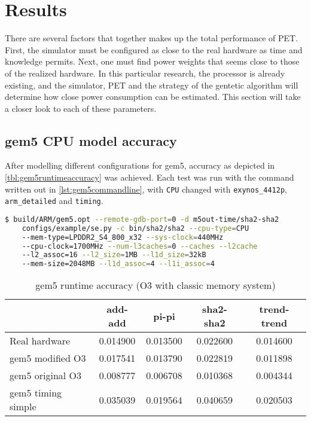 \section{Results}

There are several factors that together makes up the total performance of PET. First, the simulator must be
configured as close to the real hardware as time and knowledge permits. Next, one must find power weights that
seems close to those of the realized hardware. In this particular research, the processor is already existing,
and the simulator, PET and the strategy of the gentetic algorithm will determine how close power consumption
can be estimated. This section will take a closer look to each of these parameters.

\subsection{gem5 CPU model accuracy}

After modelling different configurations for gem5, accuracy as depicted in \autoref{tbl:gem5runtimeaccuracy}
was achieved. Each test was run with the command written out in \autoref{lst:gem5commandline}, with \texttt{CPU}
changed with  \texttt{exynos\_4412p}, \texttt{arm\_detailed} and \texttt{timing}.

\begin{lstlisting}[language=sh,label={lst:gem5commandline},caption={gem5 Command Line}]
$ build/ARM/gem5.opt --remote-gdb-port=0 -d m5out-time/sha2-sha2
    configs/example/se.py -c bin/sha2/sha2 --cpu-type=CPU
    --mem-type=LPDDR2_S4_800_x32 --sys-clock=440MHz
    --cpu-clock=1700MHz --num-l3caches=0 --caches --l2cache
    --l2_assoc=16 --l2_size=1MB --l1d_size=32kB
    --mem-size=2048MB --l1d_assoc=4 --l1i_assoc=4
\end{lstlisting}


\begin{table}
\centering
\begin{tabular}{|l|c|c|c|c|}
\hline
 & add-add & pi-pi & sha2-sha2 & trend-trend \\
\hline
Real hardware & 0.014900  & 0.013500 & 0.022600 & 0.014600 \\
gem5 modified O3    & 0.017541 & 0.013790 & 0.022819 & 0.011898 \\
gem5 original O3    & 0.008777 & 0.006708 & 0.010368 & 0.004344 \\
gem5 timing simple  & 0.035039 & 0.019564 & 0.040659 & 0.020503 \\
\hline
\end{tabular}
\caption{gem5 runtime accuracy (O3 with classic memory system)}
\label{tbl:gem5runtimeaccuracy}
\end{table}




